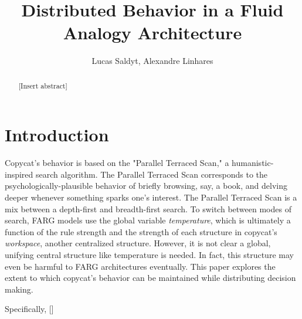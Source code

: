 \documentclass[a4paper]{article}
\title{Distributed Behavior in a Fluid Analogy Architecture}
\author{Lucas Saldyt, Alexandre Linhares}
\begin{document}
\maketitle

\begin{abstract}
    [Insert abstract]
\end{abstract}


\section{Introduction}

    Copycat's behavior is based on the "Parallel Terraced Scan," a humanistic-inspired search algorithm.
The Parallel Terraced Scan corresponds to the psychologically-plausible behavior of briefly browsing, say, a book, and delving deeper whenever something sparks one's interest. 
The Parallel Terraced Scan is a mix between a depth-first and breadth-first search.
To switch between modes of search, FARG models use the global variable \emph{temperature}, which is ultimately a function of the rule strength and the strength of each structure in copycat's \emph{workspace}, another centralized structure.
However, it is not clear a global, unifying central structure like temperature is needed.
In fact, this structure may even be harmful to FARG architectures eventually.
This paper explores the extent to which copycat's behavior can be maintained while distributing decision making.

    Specifically, []
\end{document}
